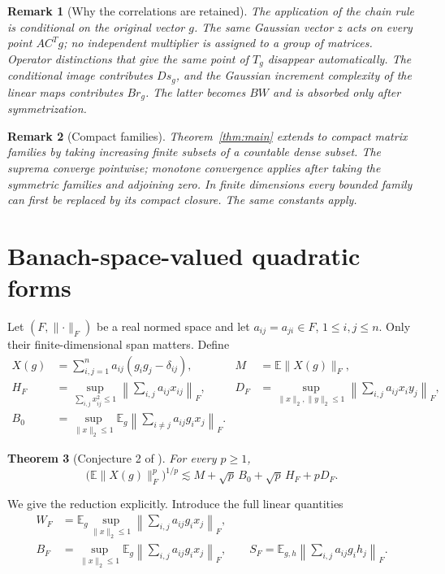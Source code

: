 \documentclass[10pt,a4paper]{amsart}
\numberwithin{equation}{section}
\newtheorem{theorem}{Theorem}[section]
\newtheorem{remark}[theorem]{Remark}
\newcommand{\E}{\mathbb E}
\newcommand{\norm}[1]{\lVert #1\rVert}
\begin{document}
\begin{remark}[Why the correlations are retained]
The application of the chain rule is conditional on the original vector $g$. The same Gaussian vector $z$ acts on every point $AC^Tg$; no independent multiplier is assigned to a group of matrices. Operator distinctions that give the same point of $T_g$ disappear automatically. The conditional image contributes $Ds_g$, and the Gaussian increment complexity of the linear maps contributes $Br_g$. The latter becomes $BW$ and is absorbed only after symmetrization.
\end{remark}

\begin{remark}[Compact families]
Theorem~\ref{thm:main} extends to compact matrix families by taking increasing finite subsets of a countable dense subset. The suprema converge pointwise; monotone convergence applies after taking the symmetric families and adjoining zero. In finite dimensions every bounded family can first be replaced by its compact closure. The same constants apply.
\end{remark}

\section{Banach-space-valued quadratic forms}

Let $(F,\norm{\cdot}_F)$ be a real normed space and let $a_{ij}=a_{ji}\in F$, $1\le i,j\le n$. Only their finite-dimensional span matters. Define
\begin{align*}
 X(g)&=\sum_{i,j=1}^n a_{ij}(g_i g_j-\delta_{ij}),
 &M&=\E\norm{X(g)}_F,\\
 H_F&=\sup_{\sum_{i,j}x_{ij}^2\le1}
       \left\|\sum_{i,j}a_{ij}x_{ij}\right\|_F,
 &D_F&=\sup_{\norm{x}_2,\norm{y}_2\le1}
       \left\|\sum_{i,j}a_{ij}x_i y_j\right\|_F,\\
 B_0&=\sup_{\norm{x}_2\le1}\E_g
       \left\|\sum_{i\ne j}a_{ij}g_i x_j\right\|_F.
\end{align*}

\begin{theorem}[Conjecture 2 of \cite{ALM}]\label{thm:banach}
For every $p\ge1$,
\begin{equation}
 \boxed{\quad
 \bigl(\E\norm{X(g)}_F^p\bigr)^{1/p}
 \lesssim M+\sqrt p\,B_0+\sqrt p\,H_F+pD_F.
 \quad}
 \label{eq:banach}
\end{equation}
\end{theorem}

We give the reduction explicitly. Introduce the full linear quantities
\begin{align*}
 W_F&=\E_g\sup_{\norm{x}_2\le1}
       \left\|\sum_{i,j}a_{ij}g_i x_j\right\|_F,\\
 B_F&=\sup_{\norm{x}_2\le1}\E_g
       \left\|\sum_{i,j}a_{ij}g_i x_j\right\|_F,
 \qquad
 S_F=\E_{g,h}\left\|\sum_{i,j}a_{ij}g_i h_j\right\|_F.
\end{align*}
\end{document}
